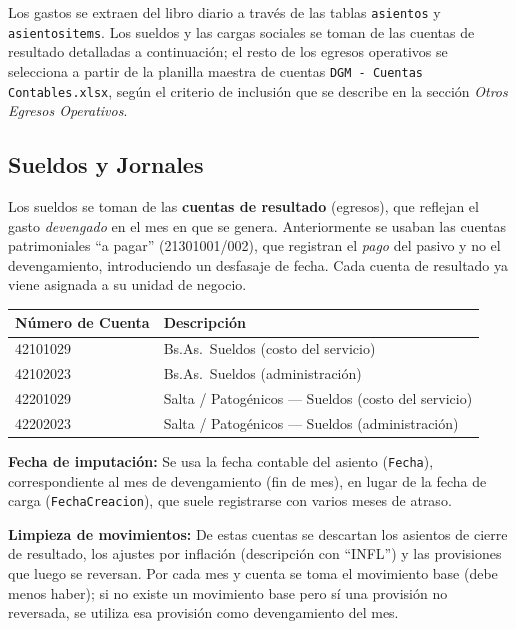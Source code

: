\documentclass[12pt, a4paper]{article}
\begin{document}
Los gastos se extraen del libro diario a través de las tablas \texttt{asientos} y \texttt{asientositems}. Los sueldos y las cargas sociales se toman de las cuentas de resultado detalladas a continuación; el resto de los egresos operativos se selecciona a partir de la planilla maestra de cuentas \texttt{DGM - Cuentas Contables.xlsx}, según el criterio de inclusión que se describe en la sección \emph{Otros Egresos Operativos}.

\subsection{Sueldos y Jornales}

Los sueldos se toman de las \textbf{cuentas de resultado} (egresos), que reflejan el gasto \emph{devengado} en el mes en que se genera. Anteriormente se usaban las cuentas patrimoniales ``a pagar'' (21301001/002), que registran el \emph{pago} del pasivo y no el devengamiento, introduciendo un desfasaje de fecha. Cada cuenta de resultado ya viene asignada a su unidad de negocio.

\vspace{0.5em}
\begin{center}
\begin{tabular}{ll}
\toprule
\rowcolor{azulclaro}
\textbf{Número de Cuenta} & \textbf{Descripción} \\
\midrule
42101029 & Bs.As.\ Sueldos (costo del servicio) \\
\rowcolor{grisclaro}
42102023 & Bs.As.\ Sueldos (administración) \\
42201029 & Salta / Patogénicos --- Sueldos (costo del servicio) \\
\rowcolor{grisclaro}
42202023 & Salta / Patogénicos --- Sueldos (administración) \\
\bottomrule
\end{tabular}
\end{center}
\vspace{0.5em}

\textbf{Fecha de imputación:} Se usa la fecha contable del asiento (\texttt{Fecha}), correspondiente al mes de devengamiento (fin de mes), en lugar de la fecha de carga (\texttt{FechaCreacion}), que suele registrarse con varios meses de atraso.

\textbf{Limpieza de movimientos:} De estas cuentas se descartan los asientos de cierre de resultado, los ajustes por inflación (descripción con ``INFL'') y las provisiones que luego se reversan. Por cada mes y cuenta se toma el movimiento base (debe menos haber); si no existe un movimiento base pero sí una provisión no reversada, se utiliza esa provisión como devengamiento del mes.
\end{document}

